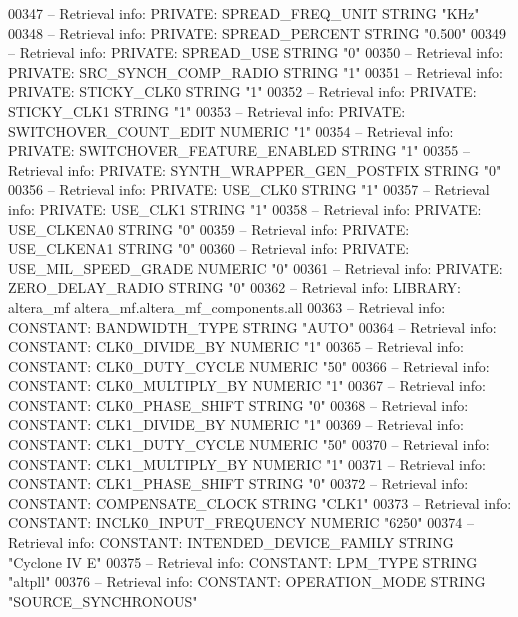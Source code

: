 \begin{DoxyCode}
{00347 \textcolor{keyword}{-- Retrieval info: PRIVATE: SPREAD\_FREQ\_UNIT STRING "KHz"}
00348 \textcolor{keyword}{-- Retrieval info: PRIVATE: SPREAD\_PERCENT STRING "0.500"}
00349 \textcolor{keyword}{-- Retrieval info: PRIVATE: SPREAD\_USE STRING "0"}
00350 \textcolor{keyword}{-- Retrieval info: PRIVATE: SRC\_SYNCH\_COMP\_RADIO STRING "1"}
00351 \textcolor{keyword}{-- Retrieval info: PRIVATE: STICKY\_CLK0 STRING "1"}
00352 \textcolor{keyword}{-- Retrieval info: PRIVATE: STICKY\_CLK1 STRING "1"}
00353 \textcolor{keyword}{-- Retrieval info: PRIVATE: SWITCHOVER\_COUNT\_EDIT NUMERIC "1"}
00354 \textcolor{keyword}{-- Retrieval info: PRIVATE: SWITCHOVER\_FEATURE\_ENABLED STRING "1"}
00355 \textcolor{keyword}{-- Retrieval info: PRIVATE: SYNTH\_WRAPPER\_GEN\_POSTFIX STRING "0"}
00356 \textcolor{keyword}{-- Retrieval info: PRIVATE: USE\_CLK0 STRING "1"}
00357 \textcolor{keyword}{-- Retrieval info: PRIVATE: USE\_CLK1 STRING "1"}
00358 \textcolor{keyword}{-- Retrieval info: PRIVATE: USE\_CLKENA0 STRING "0"}
00359 \textcolor{keyword}{-- Retrieval info: PRIVATE: USE\_CLKENA1 STRING "0"}
00360 \textcolor{keyword}{-- Retrieval info: PRIVATE: USE\_MIL\_SPEED\_GRADE NUMERIC "0"}
00361 \textcolor{keyword}{-- Retrieval info: PRIVATE: ZERO\_DELAY\_RADIO STRING "0"}
00362 \textcolor{keyword}{-- Retrieval info: LIBRARY: altera\_mf altera\_mf.altera\_mf\_components.all}
00363 \textcolor{keyword}{-- Retrieval info: CONSTANT: BANDWIDTH\_TYPE STRING "AUTO"}
00364 \textcolor{keyword}{-- Retrieval info: CONSTANT: CLK0\_DIVIDE\_BY NUMERIC "1"}
00365 \textcolor{keyword}{-- Retrieval info: CONSTANT: CLK0\_DUTY\_CYCLE NUMERIC "50"}
00366 \textcolor{keyword}{-- Retrieval info: CONSTANT: CLK0\_MULTIPLY\_BY NUMERIC "1"}
00367 \textcolor{keyword}{-- Retrieval info: CONSTANT: CLK0\_PHASE\_SHIFT STRING "0"}
00368 \textcolor{keyword}{-- Retrieval info: CONSTANT: CLK1\_DIVIDE\_BY NUMERIC "1"}
00369 \textcolor{keyword}{-- Retrieval info: CONSTANT: CLK1\_DUTY\_CYCLE NUMERIC "50"}
00370 \textcolor{keyword}{-- Retrieval info: CONSTANT: CLK1\_MULTIPLY\_BY NUMERIC "1"}
00371 \textcolor{keyword}{-- Retrieval info: CONSTANT: CLK1\_PHASE\_SHIFT STRING "0"}
00372 \textcolor{keyword}{-- Retrieval info: CONSTANT: COMPENSATE\_CLOCK STRING "CLK1"}
00373 \textcolor{keyword}{-- Retrieval info: CONSTANT: INCLK0\_INPUT\_FREQUENCY NUMERIC "6250"}
00374 \textcolor{keyword}{-- Retrieval info: CONSTANT: INTENDED\_DEVICE\_FAMILY STRING "Cyclone IV E"}
00375 \textcolor{keyword}{-- Retrieval info: CONSTANT: LPM\_TYPE STRING "altpll"}
00376 \textcolor{keyword}{-- Retrieval info: CONSTANT: OPERATION\_MODE STRING "SOURCE\_SYNCHRONOUS"}
}
\end{DoxyCode}
